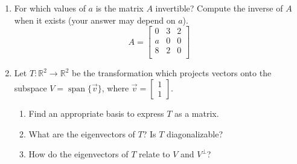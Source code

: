 \documentclass[red]{tutorial}
\newcommand{\R}{\mathbb{R}}
\newcommand{\mat}[1]{\begin{bmatrix} #1 %
\end{bmatrix}}
\DeclareMathOperator{\Span} {span}
\theoremstyle{definition}
\theoremstyle{theorem}
\begin{document}
\begin{tutorial}
\begin{enumerate}
    \item %
      For which values of $a$ is the matrix $A$ invertible? 
      Compute the inverse of $A$ when it exists 
      (your answer may depend on $a$).
      \begin{equation*}
        A = 
        \begin{bmatrix}
          0 & 3 & 2 \\
          a & 0 & 0 \\
          8 & 2 & 0 \\
        \end{bmatrix}
      \end{equation*}
    \item
      Let $T\colon\R^2\to\R^2$ be the transformation which projects vectors
      onto the subspace $V=\Span\{\vec v\}$, where $\vec v = \mat{1\\1}$.
      \begin{enumerate}
        \item Find an appropriate basis to express $T$ as a matrix.
        \item
          What are the eigenvectors of $T$? Is $T$ diagonalizable?
        \item
          How do the eigenvectors of $T$ relate to $V$ and $V^\perp$?
      \end{enumerate}
  \end{enumerate}
\end{tutorial}
\end{document}
